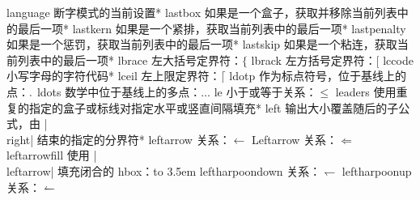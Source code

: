 \capcs language {断字模式的当前设置}*{}
\capcs lastbox {如果是一个盒子，获取并移除当前列表中的最后一项}*{}
\capcs lastkern {如果是一个紧排，获取当前列表中的最后一项}*{}
\capcs lastpenalty {如果是一个惩罚，获取当前列表中的最后一项}*{}
\capcs lastskip {如果是一个粘连，获取当前列表中的最后一项}*{}
\capcs lbrace {左大括号定界符：$\lbrace$}{}{}
\capcs lbrack {左方括号定界符：$\lbrack$}{}{}
\capcs lccode {小写字母的字符代码}*{}
\capcs lceil {左上限定界符：$\lceil$}{}{}
\capcs ldotp {作为标点符号，位于基线上的点：$\ldotp$}{}{}
\capcs ldots {数学中位于基线上的多点：$\ldots$}{}{}
\capcs le {小于或等于关系：$\le$}{}{}
\capcs leaders {使用重复的指定的盒子或标线对指定水平或竖直间隔填充}*{}
\capcs left {输出大小覆盖随后的子公式，由 |\\right| 结束的指定的分界符}*{}
\capcs leftarrow {关系：$\leftarrow$}{}{}
\capcs Leftarrow {关系：$\Leftarrow$}{}{}
\capcs leftarrowfill {使用 |\\leftarrow| 填充闭合的 hbox：\hbox to 3.5em{\leftarrowfill}}{}{}
\capcs leftharpoondown {关系：$\leftharpoondown$}{}{}
\capcs leftharpoonup {关系：$\leftharpoonup$}{}{}
